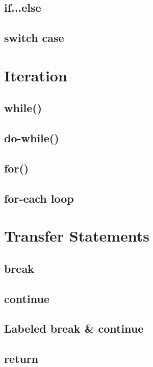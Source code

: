 \documentclass[14pt,fleqn]{extbook} %
\begin{document}
\subsection{if...else}

\subsection{switch case}

\section{Iteration}

\subsection{while()}

\subsection{do-while()}

\subsection{for()}

\subsection{for-each loop}

\section{Transfer Statements}

\subsection{break}

\subsection{continue}

\subsection{Labeled break \& continue}

\subsection{return}
%
\end{document}
